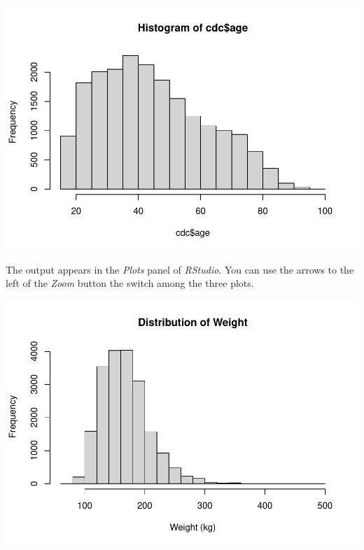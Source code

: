 \documentclass[
]{book}
\newenvironment{Shaded}{\begin{snugshade}}{\end{snugshade}}
\newcommand{\DataTypeTok}[1]{\textcolor[rgb]{0.13,0.29,0.53}{#1}}
\newcommand{\DecValTok}[1]{\textcolor[rgb]{0.00,0.00,0.81}{#1}}
\newcommand{\KeywordTok}[1]{\textcolor[rgb]{0.13,0.29,0.53}{\textbf{#1}}}
\newcommand{\NormalTok}[1]{#1}
\newcommand{\OperatorTok}[1]{\textcolor[rgb]{0.81,0.36,0.00}{\textbf{#1}}}
\newcommand{\StringTok}[1]{\textcolor[rgb]{0.31,0.60,0.02}{#1}}
\begin{document}
\begin{Shaded}
\end{Shaded}

\includegraphics{_main_files/figure-latex/unnamed-chunk-127-3.pdf}

The output appears in the \emph{Plots} panel of \emph{RStudio}. You can use the arrows to the left of the \emph{Zoom} button the switch among the three plots.

\begin{Shaded}
\end{Shaded}

\includegraphics{_main_files/figure-latex/unnamed-chunk-128-1.pdf}
\end{document}
